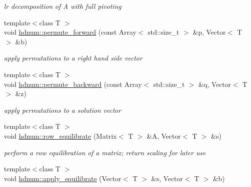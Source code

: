\begin{DoxyCompactItemize}
\begin{DoxyCompactList}\small\item\em lr decomposition of A with full pivoting \item\end{DoxyCompactList}\item 
\hypertarget{namespacehdnum_afebc7f6525181712ff86cf82b21200e3}{
{\footnotesize template$<$class T $>$ }\\void \hyperlink{namespacehdnum_afebc7f6525181712ff86cf82b21200e3}{hdnum::permute\_\-forward} (const Array$<$ std::size\_\-t $>$ \&p, Vector$<$ T $>$ \&b)}
\label{namespacehdnum_afebc7f6525181712ff86cf82b21200e3}

\begin{DoxyCompactList}\small\item\em apply permutations to a right hand side vector \item\end{DoxyCompactList}\item 
\hypertarget{namespacehdnum_ad7a4d91e943ea48de3d44d83649b118a}{
{\footnotesize template$<$class T $>$ }\\void \hyperlink{namespacehdnum_ad7a4d91e943ea48de3d44d83649b118a}{hdnum::permute\_\-backward} (const Array$<$ std::size\_\-t $>$ \&q, Vector$<$ T $>$ \&z)}
\label{namespacehdnum_ad7a4d91e943ea48de3d44d83649b118a}

\begin{DoxyCompactList}\small\item\em apply permutations to a solution vector \item\end{DoxyCompactList}\item 
\hypertarget{namespacehdnum_a8c1b2c65058180de1615d4c1ed0d2477}{
{\footnotesize template$<$class T $>$ }\\void \hyperlink{namespacehdnum_a8c1b2c65058180de1615d4c1ed0d2477}{hdnum::row\_\-equilibrate} (Matrix$<$ T $>$ \&A, Vector$<$ T $>$ \&s)}
\label{namespacehdnum_a8c1b2c65058180de1615d4c1ed0d2477}

\begin{DoxyCompactList}\small\item\em perform a row equilibration of a matrix; return scaling for later use \item\end{DoxyCompactList}\item 
\hypertarget{namespacehdnum_a2ad73407e4bc97cb60118019e4af7c24}{
{\footnotesize template$<$class T $>$ }\\void \hyperlink{namespacehdnum_a2ad73407e4bc97cb60118019e4af7c24}{hdnum::apply\_\-equilibrate} (Vector$<$ T $>$ \&s, Vector$<$ T $>$ \&b)}
\label{namespacehdnum_a2ad73407e4bc97cb60118019e4af7c24}


\end{DoxyCompactItemize}
